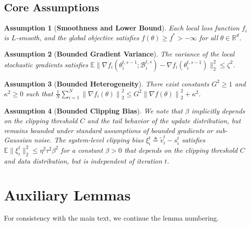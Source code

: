 \documentclass[conference]{IEEEtran}
\newtheorem{assumption}{Assumption}
\begin{document}
\subsection{Core Assumptions}

\begin{assumption}[\bf Smoothness and Lower Bound]
    \label{assum:smoothness}
    Each local loss function $f_i$ is $L$-smooth, and the global objective satisfies $f(\theta) \ge f^\ast > -\infty$ for all $\theta \in \mathbb{R}^d$.
\end{assumption}

\begin{assumption}[\bf Bounded Gradient Variance]
    \label{assum:variance}
    The variance of the local stochastic gradients satisfies $\mathbb{E}\big\lVert\nabla f_i(\theta_i^{t,s-1}; \mathcal{B}_i^{t, s}) - \nabla f_i(\theta_i^{t,s-1})\big\rVert_2^2 \le \zeta^2$. 
\end{assumption}

\begin{assumption}[\bf Bounded Heterogeneity]
    \label{assum:heterogeneity}
    There exist constants $G^2 \ge 1$ and $\kappa^2 \ge 0$ such that  $\frac{1}{N} \sum_{i=1}^N \left\lVert\nabla f_i(\theta)\right\rVert_2^2 \le G^2 \left\lVert\nabla f(\theta)\right\rVert_2^2 + \kappa^2$.
\end{assumption}

\begin{assumption}[\bf Bounded Clipping Bias]
    \label{assum:clipping}
    We note that $\beta$ implicitly depends on the clipping threshold $C$ and the tail behavior of the update distribution, but remains bounded under standard assumptions of bounded gradients or sub-Gaussian noise. The system-level clipping bias $\xi_i^t \triangleq \tilde{v}_i^t - s_i^t$ satisfies $\mathbb{E}\lVert\xi_i^t\rVert_2^2 \le \eta^2\tau^2 \beta^2$ for a constant $\beta > 0$ that depends on the clipping threshold $C$ and data distribution, but is independent of iteration $t$.
\end{assumption}


\section{Auxiliary Lemmas}
For consistency with the main text, we continue the lemma numbering.

\setcounter{lemma}{2} 
\end{document}
